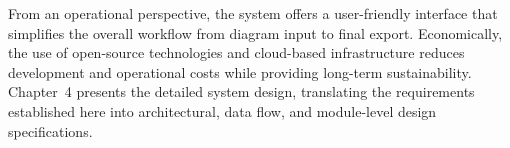 From an operational perspective, the system offers a user-friendly 
interface that simplifies the overall workflow from diagram input to 
final export. Economically, the use of open-source technologies and 
cloud-based infrastructure reduces development and operational costs 
while providing long-term sustainability. Chapter~4 presents the 
detailed system design, translating the requirements established here 
into architectural, data flow, and module-level design 
specifications.